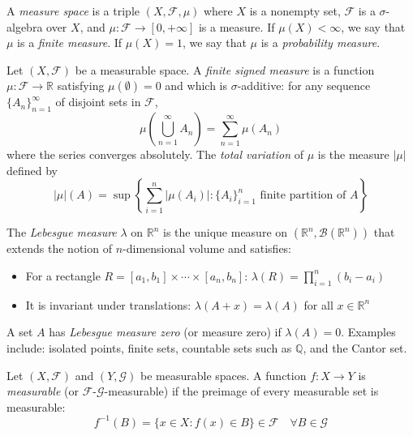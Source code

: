 \begin{definition}\label{def:espacio_medida}
	A \textit{measure space} is a triple $(X, \mathcal{F}, \mu)$ where $X$ is a nonempty set, $\mathcal{F}$ is a $\sigma$-algebra over $X$, and $\mu: \mathcal{F} \to [0, +\infty]$ is a measure. If $\mu(X) < \infty$, we say that $\mu$ is a \textit{finite measure}. If $\mu(X) = 1$, we say that $\mu$ is a \textit{probability measure}.
\end{definition}

\begin{definition}\label{def:medida_con_signo}
	Let $(X, \mathcal{F})$ be a measurable space. A \textit{finite signed measure} is a function $\mu: \mathcal{F} \to \mathbb{R}$ satisfying $\mu(\emptyset) = 0$ and which is $\sigma$-additive: for any sequence $\{A_n\}_{n=1}^\infty$ of disjoint sets in $\mathcal{F}$,
	\[
		\mu\left(\bigcup_{n=1}^\infty A_n\right) = \sum_{n=1}^\infty \mu(A_n)
	\]
	where the series converges absolutely. The \textit{total variation} of $\mu$ is the measure $|\mu|$ defined by
	\[
		|\mu|(A) = \sup \left\{ \sum_{i=1}^n |\mu(A_i)| : \{A_i\}_{i=1}^n \text{ finite partition of } A \right\}
	\]
\end{definition}

\begin{definition}\label{def:medida_lebesgue}
	The \textit{Lebesgue measure} $\lambda$ on $\mathbb{R}^n$ is the unique measure on $(\mathbb{R}^n, \mathcal{B}(\mathbb{R}^n))$ that extends the notion of $n$-dimensional volume and satisfies:
	\begin{itemize}
		\item For a rectangle $R = [a_1, b_1] \times \cdots \times [a_n, b_n]$: $\lambda(R) = \prod_{i=1}^n (b_i - a_i)$
		\item It is invariant under translations: $\lambda(A + x) = \lambda(A)$ for all $x \in \mathbb{R}^n$
	\end{itemize}
\end{definition}

A set $A$ has \textit{Lebesgue measure zero} (or measure zero) if $\lambda(A) = 0$. Examples include: isolated points, finite sets, countable sets such as $\mathbb{Q}$, and the Cantor set.

\begin{definition}\label{def:funcion_medible}
	Let $(X, \mathcal{F})$ and $(Y, \mathcal{G})$ be measurable spaces. A function $f: X \to Y$ is \textit{measurable} (or $\mathcal{F}$-$\mathcal{G}$-measurable) if the preimage of every measurable set is measurable:
	\[
		f^{-1}(B) = \{x \in X : f(x) \in B\} \in \mathcal{F} \quad \forall B \in \mathcal{G}
	\]
\end{definition}

